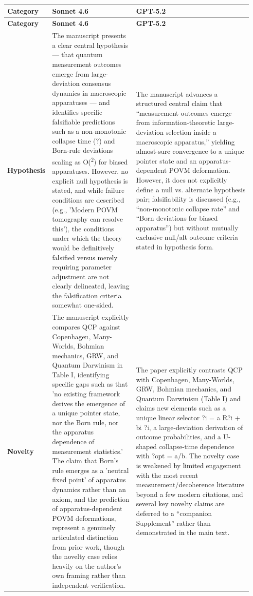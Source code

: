 \documentclass[11pt]{article}
\begin{document}
\begin{longtable}{@{} p{2.2cm} p{6.3cm} p{6.3cm} @{}}
\toprule
\textbf{Category} & \textbf{Sonnet 4.6} & \textbf{GPT-5.2} \\
\midrule
\endfirsthead
\toprule
\textbf{Category} & \textbf{Sonnet 4.6} & \textbf{GPT-5.2} \\
\midrule
\endhead
\bottomrule
\endlastfoot

\rowcolor{rowgray}
\textbf{Hypothesis} &
The manuscript presents a clear central hypothesis --- that quantum measurement outcomes emerge from large-deviation consensus dynamics in macroscopic apparatuses --- and identifies specific falsifiable predictions such as a non-monotonic collapse time \texttau{}(?) and Born-rule deviations scaling as O(\textbeta{}\textsuperscript{2}) for biased apparatuses. However, no explicit null hypothesis is stated, and while failure conditions are described (e.g., 'Modern POVM tomography can resolve this'), the conditions under which the theory would be definitively falsified versus merely requiring parameter adjustment are not clearly delineated, leaving the falsification criteria somewhat one-sided. &
The manuscript advances a structured central claim that ``measurement outcomes emerge from information-theoretic large-deviation selection inside a macroscopic apparatus,'' yielding almost-sure convergence to a unique pointer state and an apparatus-dependent POVM deformation. However, it does not explicitly define a null vs. alternate hypothesis pair; falsifiability is discussed (e.g., ``non-monotonic collapse rate'' and ``Born deviations for biased apparatus'') but without mutually exclusive null/alt outcome criteria stated in hypothesis form. \\[6pt]

\textbf{Novelty} &
The manuscript explicitly compares QCP against Copenhagen, Many-Worlds, Bohmian mechanics, GRW, and Quantum Darwinism in Table I, identifying specific gaps such as that 'no existing framework derives the emergence of a unique pointer state, nor the Born rule, nor the apparatus dependence of measurement statistics.' The claim that Born's rule emerges as a 'neutral fixed point' of apparatus dynamics rather than an axiom, and the prediction of apparatus-dependent POVM deformations, represent a genuinely articulated distinction from prior work, though the novelty case relies heavily on the author's own framing rather than independent verification. &
The paper explicitly contrasts QCP with Copenhagen, Many-Worlds, GRW, Bohmian mechanics, and Quantum Darwinism (Table I) and claims new elements such as a unique linear selector ?i = a R?i + bi ?i, a large-deviation derivation of outcome probabilities, and a U-shaped collapse-time dependence with ?opt = a/b. The novelty case is weakened by limited engagement with the most recent measurement/decoherence literature beyond a few modern citations, and several key novelty claims are deferred to a ``companion Supplement'' rather than demonstrated in the main text. \\[6pt]


\end{longtable}
\end{document}
